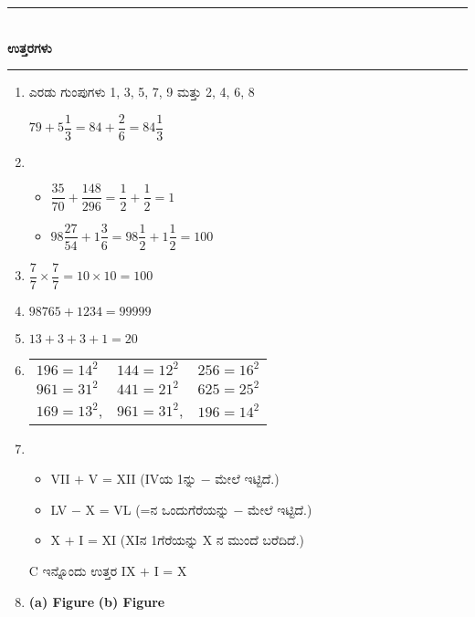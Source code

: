 \smallskip

\begin{center}
\rule{5cm}{1pt}\\[5pt]
{\Large\bfseries ಉತ್ತರಗಳು}\\[3pt]
\rule{5cm}{1pt}
\end{center}

\begin{enumerate}
\item ಎರಡು ಗುಂಪುಗಳು 1, 3, 5, 7, 9 ಮತ್ತು 2, 4, 6, 8

$79 + 5\dfrac{1}{3} = 84 + \dfrac{2}{6} = 84\dfrac{1}{3}$

\item 
\begin{itemize}
\item[(a)] $\dfrac{35}{70} + \dfrac{148}{296} = \dfrac{1}{2} + \dfrac{1}{2} = 1$
\item[(b)] $98 \dfrac{27}{54} + 1\dfrac{3}{6} = 98\dfrac{1}{2} + 1\dfrac{1}{2} = 100$
\end{itemize}

\item $\dfrac{7}{7}\times \dfrac{7}{7} = 10\times 10 = 100$

\smallskip
\item $98765 + 1234 = 99999$

\item $13 + 3 + 3 + 1 = 20$

\item 

\begin{tabular}[t]{lll}
$196 = 14^{2}$ & $144 = 12^{2}$ & $256 = 16^{2}$\\
$961 = 31^{2}$ & $441 = 21^{2}$ & $625 = 25^{2}$\\
$169 = 13^{2}$, & $961 = 31^{2}$, & $196 = 14^{2}$
\end{tabular}

\item 
\begin{itemize}
\item[(a)] VII $+$ V = XII (IVಯ 1ನ್ನು $-$ ಮೇಲೆ ಇಟ್ಟಿದೆ.)
\item[(b)] LV $-$ X = VL (=ನ ಒಂದುಗೆರೆಯನ್ನು $-$ ಮೇಲೆ ಇಟ್ಟಿದೆ.)
\item[(c)] X $+$ I = XI (XIನ 1ಗೆರೆಯನ್ನು X ನ ಮುಂದೆ ಬರೆದಿದೆ.)
\end{itemize}

C ಇನ್ನೊಂದು ಉತ್ತರ IX $+$ I = X

\item 
\begin{center}
{\bf (a) Figure}
{\bf (b) Figure}
\end{center}


\end{enumerate}
